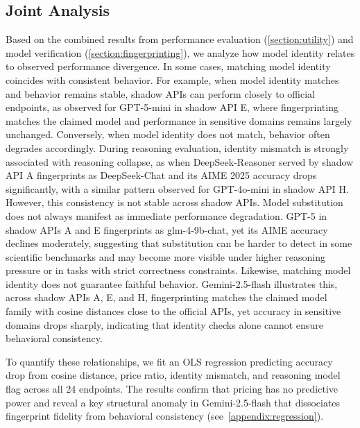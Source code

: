 \documentclass[letterpaper,twocolumn,10pt]{article}
\begin{document}
\subsection{Joint Analysis}
\label{section:joint}
Based on the combined results from performance evaluation (\autoref{section:utility}) and model verification (\autoref{section:fingerprinting}), we analyze how model identity relates to observed performance divergence.
In some cases, matching model identity coincides with consistent behavior. 
For example, when model identity matches and behavior remains stable, shadow APIs can perform closely to official endpoints, as observed for GPT-5-mini in shadow API E, where fingerprinting matches the claimed model and performance in sensitive domains remains largely unchanged. 
Conversely, when model identity does not match, behavior often degrades accordingly. During reasoning evaluation, identity mismatch is strongly associated with reasoning collapse, as when DeepSeek-Reasoner served by shadow API A fingerprints as DeepSeek-Chat and its AIME 2025 accuracy drops significantly, with a similar pattern observed for GPT-4o-mini in shadow API H.
However, this consistency is not stable across shadow APIs. 
Model substitution does not always manifest as immediate performance degradation. 
GPT-5 in shadow APIs A and E fingerprints as glm-4-9b-chat, yet its AIME accuracy declines moderately, suggesting that substitution can be harder to detect in some scientific benchmarks and may become more visible under higher reasoning pressure or in tasks with strict correctness constraints. 
Likewise, matching model identity does not guarantee faithful behavior. 
Gemini-2.5-flash illustrates this, across shadow APIs A, E, and H, fingerprinting matches the claimed model family with cosine distances close to the official APIs, yet accuracy in sensitive domains drops sharply, indicating that identity checks alone cannot ensure behavioral consistency.

To quantify these relationships, we fit an OLS regression predicting accuracy drop from cosine distance, price ratio, identity mismatch, and reasoning model flag across all 24 endpoints. 
The results confirm that pricing has no predictive power and reveal a key structural anomaly in Gemini-2.5-flash that dissociates fingerprint fidelity from behavioral consistency (see~\autoref{appendix:regression}).

\end{document}
